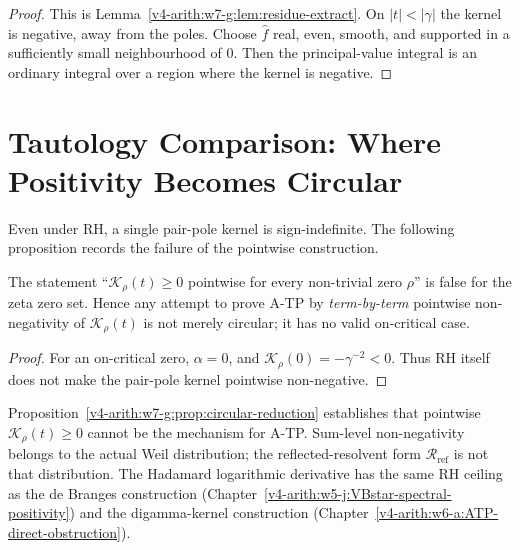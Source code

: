 \begin{proof}
This is Lemma~\ref{v4-arith:w7-g:lem:residue-extract}. On
\(|t|<|\gamma|\) the kernel is negative, away from the poles. Choose
\(\widehat f\) real, even, smooth, and supported in a sufficiently
small neighbourhood of \(0\). Then the principal-value integral is an
ordinary integral over a region where the kernel is negative.
\end{proof}

\section{Tautology Comparison: Where Positivity Becomes Circular}
\label{v4-arith:w7-g:tautology-comparison}

Even under RH, a single pair-pole kernel is sign-indefinite. The
following proposition records the failure of the pointwise construction.

\begin{proposition}
\label{v4-arith:w7-g:prop:circular-reduction}
The statement
``\(\mathcal{K}_{\rho}(t)\geq 0\) pointwise for every non-trivial zero
\(\rho\)'' is false for the zeta zero set. Hence any attempt to prove
A-TP by \emph{term-by-term} pointwise non-negativity of
\(\mathcal{K}_{\rho}(t)\) is not merely circular; it has no valid
on-critical case.
\end{proposition}

\begin{proof}
For an on-critical zero, \(\alpha=0\), and
\(\mathcal K_{\rho}(0)=-\gamma^{-2}<0\). Thus RH itself does not make
the pair-pole kernel pointwise non-negative.
\end{proof}

\begin{remark}
\label{v4-arith:w7-g:rem:ruled-out-pointwise}
Proposition~\ref{v4-arith:w7-g:prop:circular-reduction} establishes
that pointwise \(\mathcal{K}_{\rho}(t)\geq 0\) cannot be the mechanism
for A-TP. Sum-level non-negativity belongs to the actual Weil
distribution; the reflected-resolvent form
\(\mathcal R_{\mathrm{ref}}\) is not that distribution. The
Hadamard logarithmic derivative has the same RH ceiling as the de Branges construction
(Chapter~\ref{v4-arith:w5-j:VBstar-spectral-positivity}) and the
digamma-kernel construction (Chapter~\ref{v4-arith:w6-a:ATP-direct-obstruction}).
\end{remark}

